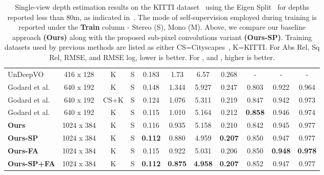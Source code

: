 \documentclass[letterpaper, 10 pt, conference]{ieeeconf}  \IEEEoverridecommandlockouts
\begin{document}
\begin{table*}[h]
{\begin{tabular}{lcccccccccc}
\midrule
UnDeepVO~\cite{li2017undeepvo} & 416 x 128 & K & S & 0.183 & 1.73 & 6.57 & 0.268 & - & - & - \\
Godard et al.~\cite{godard2017unsupervised} & 640 x 192 & K & S & 0.148 & 1.344 & 5.927 & 0.247 & 0.803 & 0.922 & 0.964\\
Godard et al.~\cite{godard2017unsupervised} & 640 x 192 & CS+K & S & 0.124 & 1.076 & 5.311 & 0.219 & 0.847 & 0.942 & 0.973\\
Godard et al.~\cite{godard2018digging} & 640 x 192 & K & S & 0.115 & 1.010 & 5.164 & 0.212 & \textbf{0.858} & 0.946 & 0.974\\
\textbf{Ours} & 1024 x 384 & K & S & 0.116 & 0.935 &  5.158 & 0.210 &  0.842 &  0.945 &  0.977\\
\textbf{Ours-SP} & 1024 x 384 & K & S & \textbf{0.112} & 0.880 & 4.959 & \textbf{0.207} & 0.850 & 0.947 & 0.977\\
\textbf{Ours-FA} & 1024 x 384 & K & S & 0.115 & 0.922 & 5.031 & 0.206 & 0.850 & \textbf{0.948} & \textbf{0.978}\\
\textbf{Ours-SP+FA} & 1024 x 384 & K & S & \textbf{0.112} & \textbf{0.875} & \textbf{4.958} & \textbf{0.207} & 0.852 & 0.947 & 0.977\\
\bottomrule
\end{tabular}\\
}
\caption{Single-view depth estimation results on the KITTI dataset~\cite{geiger2013vision} using the Eigen Split~\cite{eigen2014depth} for depths reported less than 80m, as indicated in~\cite{eigen2014depth}. The mode of self-supervision employed during training is reported under the \textbf{Train} column - Stereo (S), Mono (M). Above, we compare our baseline approach \textbf{(Ours)} along with the proposed sub-pixel convolutions variant \textbf{(Ours-SP)}. Training datasets used by previous methods are listed as either CS=Cityscapes~\cite{cordts2016cityscapes}, K=KITTI\cite{geiger2013vision}. For Abs Rel, Sq Rel, RMSE, and RMSE log, lower is better. For ,  and , higher is better.}
\label{table:accuracy}
\vspace{-6mm}
\end{table*}
 
\end{document}
